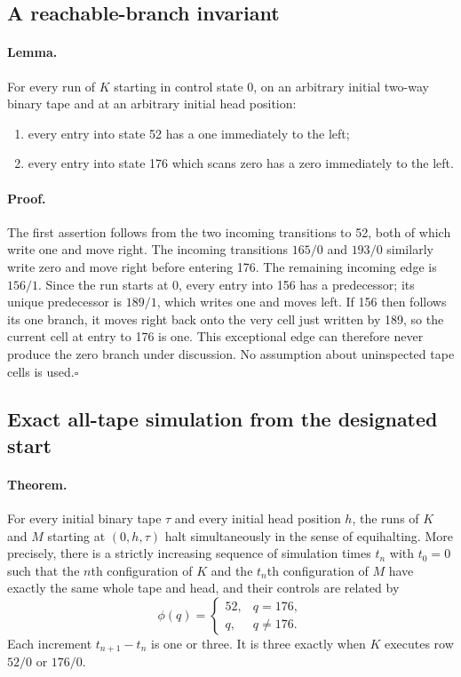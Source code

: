 \subsection{A reachable-branch invariant}

\paragraph{Lemma.}
For every run of $K$ starting in control state 0, on an arbitrary initial
two-way binary tape and at an arbitrary initial head position:
\begin{enumerate}
\item every entry into state 52 has a one immediately to the left;
\item every entry into state 176 which scans zero has a zero immediately to
      the left.
\end{enumerate}

\paragraph{Proof.}
The first assertion follows from the two incoming transitions to 52, both
of which write one and move right.  The incoming transitions $165/0$ and
$193/0$ similarly write zero and move right before entering 176.
The remaining incoming edge is $156/1$.  Since the run starts at 0, every
entry into 156 has a predecessor; its unique predecessor is $189/1$, which
writes one and moves left.  If 156 then follows its one branch, it moves right
back onto the very cell just written by 189, so the current cell at entry to
176 is one.  This exceptional edge can therefore never produce the zero
branch under discussion.  No assumption about uninspected tape cells is
used.\hfill$\square$

\subsection{Exact all-tape simulation from the designated start}

\paragraph{Theorem.}
For every initial binary tape $\tau$ and every initial head position $h$, the
runs of $K$ and $M$ starting at $(0,h,\tau)$ halt simultaneously in the sense
of equihalting.  More precisely, there is a strictly increasing sequence of
simulation times $t_n$ with $t_0=0$ such that the $n$th configuration of $K$
and the $t_n$th configuration of $M$ have exactly the same whole tape and head,
and their controls are related by
\[
 \phi(q)=\begin{cases}52,&q=176,\\q,&q\ne176.\end{cases}
\]
Each increment $t_{n+1}-t_n$ is one or three.  It is three exactly when $K$
executes row $52/0$ or $176/0$.

